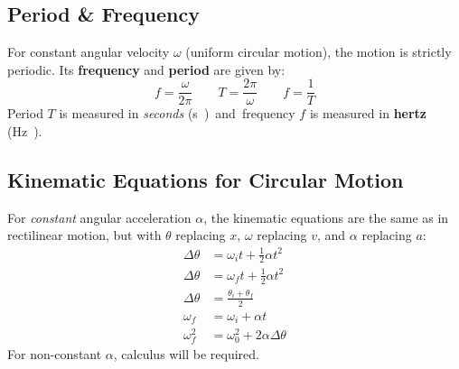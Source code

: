 %
%
%
\subsection{Period \& Frequency}
For constant angular velocity $\omega$ (uniform circular motion), the motion
is strictly periodic. Its \textbf{frequency} and \textbf{period} are given by:
\begin{equation}
  \boxed{ f=\frac\omega{2\pi} }\quad\quad
  \boxed{ T=\frac{2\pi}\omega}\quad\quad
  \boxed{ f=\frac1T}
\end{equation}
Period $T$ is measured in \emph{seconds} (\si\second) and frequency $f$ is
measured in \textbf{hertz} (\si\hertz).
  



\subsection{Kinematic Equations for Circular Motion}
For \emph{constant} angular acceleration $\alpha$, the kinematic equations are
the same as in rectilinear motion, but with $\theta$ replacing $x$, $\omega$
replacing $v$, and $\alpha$ replacing $a$:
\begin{align}
  \Delta\theta &= \omega_i t + \frac12\alpha t^2\\
  \Delta\theta &= \omega_f t + \frac12\alpha t^2\\
  \Delta\theta &=\frac{\theta_i+\theta_f}2 \\
  \omega_f &=\omega_i + \alpha t\\
  \omega_f^2& = \omega_0^2+ 2\alpha\Delta\theta
\end{align}
For non-constant $\alpha$, calculus will be required.




